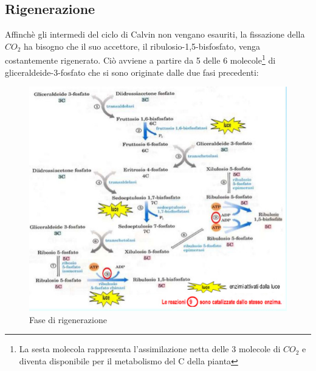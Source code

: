 \documentclass[a4paper,12pt]{book}
\begin{document}
\subsection{Rigenerazione}
Affinchè gli intermedi del ciclo di Calvin non vengano esauriti, la fissazione della $CO_{2}$ ha bisogno che il suo accettore, il ribulosio-1,5-bisfosfato, venga costantemente rigenerato. Ciò avviene a partire da 5 delle 6 molecole\footnote{La sesta molecola rappresenta l'assimilazione netta delle 3 molecole di $CO_{2}$ e diventa disponibile per il metabolismo del C della pianta} di gliceraldeide-3-fosfato che si sono originate dalle due fasi precedenti:
\begin{figure}[H]
\centering
\includegraphics[scale=0.4]{immagini/rigenerazione.jpg}
\caption{Fase di rigenerazione}
\end{figure}
\end{document}
